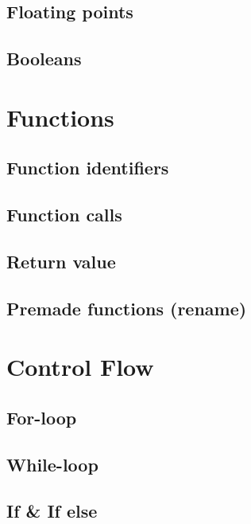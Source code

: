 \subsection{Floating points}

\subsection{Booleans}

\section{Functions}
\subsection{Function identifiers}

\subsection{Function calls}

\subsection{Return value}

\subsection{Premade functions (rename)}


\section{Control Flow}
\subsection{For-loop}

\subsection{While-loop}

\subsection{If \& If else}
